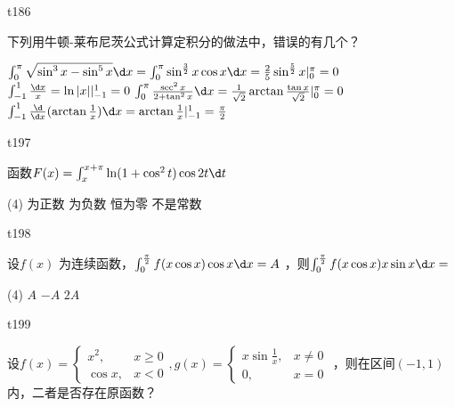 \begin{question}
    t186

    下列用牛顿-莱布尼茨公式计算定积分的做法中，错误的有几个？
    \begin{tasks}
        \task   $ \int_{0}^{\pi} \sqrt{\sin^3 x - \sin^5 x} \d x = \int_{0}^{\pi} \sin^{\frac 3 2} x \cos x \d x = \frac 2 5 \sin^{\frac 5 2} x |_0^\pi = 0 $ 
        \task   $ \int_{-1}^{1} \frac{\d x}{x} = \ln |x||_{-1}^1 = 0 $ 
        \task   $ \int_{0}^{\pi} \frac{\sec^2 x}{2 + \tan^2 x} \d x = \frac{1}{\sqrt{2}} \arctan \frac{\tan x}{\sqrt{2}} |_0^{\pi} = 0 $ 
        \task   $ \int_{-1}^{1} \frac{\d}{\d x} (\arctan \frac{1}{x}) \d x = \arctan \frac{1}{x} |_{-1}^1 = \frac{\pi}{2} $ 
    \end{tasks}
\end{question}

\begin{question}
    t197

    函数$ F(x) = \int_{x}^{x + \pi} \ln(1 + \cos^2 t) \cos 2t \d t $ 
    \begin{tasks}(4)
        \task   为正数
        \task   为负数
        \task   恒为零
        \task   不是常数
    \end{tasks}
\end{question}

\begin{question}
    t198

    设$ f(x) $ 为连续函数，$ \int_{0}^{\frac{\pi}{2}} f(x\cos x) \cos x \d x = A $ ，则$ \int_{0}^{\frac{\pi}{2}} f(x\cos x)x \sin x \d x = $ 
    \begin{tasks}(4)
        \task   $ A $ 
        \task   $ -A $
        \task   $ 2A $  
    \end{tasks}
\end{question}

\begin{question}
    t199

    设$ f(x) = \begin{cases}
        x^2, &x \ge 0 \\
        \cos x , &x < 0
    \end{cases}, g(x) = \begin{cases}
        x\sin \frac 1 x , &x \neq 0 \\
        0, &x = 0
    \end{cases}$ ，则在区间$ (-1, 1) $ 内，二者是否存在原函数？
\end{question}


